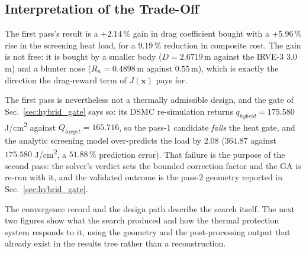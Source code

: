 \subsection{Interpretation of the Trade-Off}
The first pass's result is a $+2.14\,\%$ gain in drag coefficient bought with a +5.96\,\% rise in the screening heat load, for a $9.19\,\%$ reduction in composite cost. The gain is not free: it is bought by a smaller body ($D = 2.6719$\,m against the IRVE-3 $3.0$\,m) and a blunter nose ($R_n = 0.4898$\,m against $0.55$\,m), which is exactly the direction the drag-reward term of $J(\mathbf{x})$ pays for.

The first pass is nevertheless not a thermally admissible design, and the gate of Sec.~\ref{sec:hybrid_gate} says so: its DSMC re-simulation returns $q_{hybrid} = 175.580$ J/cm\textsuperscript{2} against $Q_{target} = 165.716$, so the pass-1 candidate \emph{fails} the heat gate, and the analytic screening model over-predicts the load by $2.08$ ($364.87$ against $175.580$ J/cm\textsuperscript{2}, a $51.88\,\%$ prediction error). That failure is the purpose of the second pass: the solver's verdict sets the bounded correction factor and the GA is re-run with it, and the validated outcome is the pass-2 geometry reported in Sec.~\ref{sec:hybrid_gate}.



The convergence record and the design path describe the search itself. The next two figures show what the search produced and how the thermal protection system responds to it, using the geometry and the post-processing output that already exist in the results tree rather than a reconstruction.

